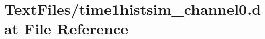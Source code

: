 \hypertarget{TextFiles_2time1histsim__channel0_8dat}{}\section{Text\+Files/time1histsim\+\_\+channel0.dat File Reference}
\label{TextFiles_2time1histsim__channel0_8dat}

